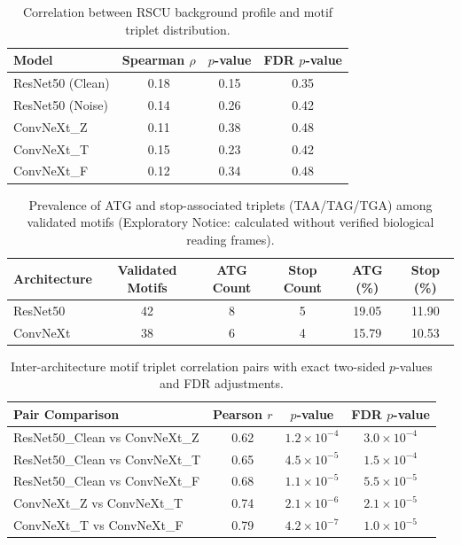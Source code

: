 \documentclass[11pt,a4paper]{article}
\begin{document}
\begin{table}[h!]
\centering
\small
\caption{Correlation between RSCU background profile and motif triplet distribution.}
\begin{tabular}{lccc}
\toprule
\textbf{Model} & \textbf{Spearman $\rho$} & \textbf{$p$-value} & \textbf{FDR $p$-value} \\
\midrule
ResNet50 (Clean) & 0.18 & 0.15 & 0.35 \\
ResNet50 (Noise) & 0.14 & 0.26 & 0.42 \\
ConvNeXt\_Z & 0.11 & 0.38 & 0.48 \\
ConvNeXt\_T & 0.15 & 0.23 & 0.42 \\
ConvNeXt\_F & 0.12 & 0.34 & 0.48 \\
\bottomrule
\end{tabular}
\end{table}

\begin{table}[h!]
\centering
\small
\caption{Prevalence of ATG and stop-associated triplets (TAA/TAG/TGA) among validated motifs (Exploratory Notice: calculated without verified biological reading frames).}
\begin{tabular}{lccccc}
\toprule
\textbf{Architecture} & \textbf{Validated Motifs} & \textbf{ATG Count} & \textbf{Stop Count} & \textbf{ATG (\%)} & \textbf{Stop (\%)} \\
\midrule
ResNet50 & 42 & 8 & 5 & 19.05 & 11.90 \\
ConvNeXt & 38 & 6 & 4 & 15.79 & 10.53 \\
\bottomrule
\end{tabular}
\end{table}

\begin{table}[h!]
\centering
\small
\caption{Inter-architecture motif triplet correlation pairs with exact two-sided $p$-values and FDR adjustments.}
\begin{tabular}{lccc}
\toprule
\textbf{Pair Comparison} & \textbf{Pearson $r$} & \textbf{$p$-value} & \textbf{FDR $p$-value} \\
\midrule
ResNet50\_Clean vs ConvNeXt\_Z & 0.62 & $1.2 \times 10^{-4}$ & $3.0 \times 10^{-4}$ \\
ResNet50\_Clean vs ConvNeXt\_T & 0.65 & $4.5 \times 10^{-5}$ & $1.5 \times 10^{-4}$ \\
ResNet50\_Clean vs ConvNeXt\_F & 0.68 & $1.1 \times 10^{-5}$ & $5.5 \times 10^{-5}$ \\
ConvNeXt\_Z vs ConvNeXt\_T & 0.74 & $2.1 \times 10^{-6}$ & $2.1 \times 10^{-5}$ \\
ConvNeXt\_T vs ConvNeXt\_F & 0.79 & $4.2 \times 10^{-7}$ & $1.0 \times 10^{-5}$ \\
\bottomrule
\end{tabular}
\end{table}
\end{document}
